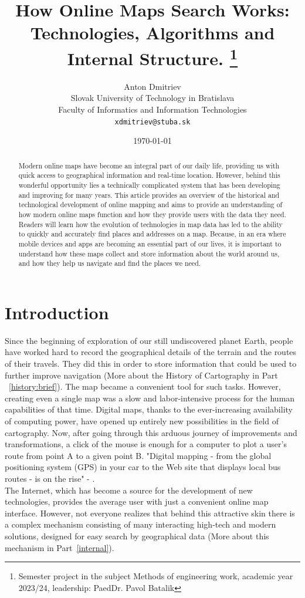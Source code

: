 \documentclass[10pt,oneside,english,a4paper]{article}
\title{How Online Maps Search Works: Technologies, Algorithms and Internal Structure.
\thanks{Semester project in the subject Methods of engineering work, academic year 2023/24, leadership: PaedDr. Pavol Batalik}}
\author{Anton Dmitriev\\[2pt]
	{\small Slovak University of Technology in Bratislava}\\
	{\small Faculty of Informatics and Information Technologies}\\
	{\small \texttt{xdmitriev@stuba.sk}}
	}
\date{\small \today}
\begin{document}
\maketitle

\begin{abstract}
	Modern online maps have become an integral part of our daily life, providing us with quick access to geographical information and real-time location. However, behind this wonderful opportunity lies a technically complicated system that has been developing and improving for many years. This article provides an overview of the historical and technological development of online mapping and aims to provide an understanding of how modern online maps function and how they provide users with the data they need. Readers will learn how the evolution of technologies in map data has led to the ability to quickly and accurately find places and addresses on a map. Because, in an era where mobile devices and apps are becoming an essential part of our lives, it is important to understand how these maps collect and store information about the world around us, and how they help us navigate and find the places we need.
\end{abstract}



\section{Introduction}
Since the beginning of exploration of our still undiscovered planet Earth, people have worked hard to record the geographical details of the terrain and the routes of their travels. They did this in order to store information that could be used to further improve navigation (More about the History of Cartography in Part ~\ref{history:brief}). The map became a convenient tool for such tasks. However, creating even a single map was a slow and labor-intensive process for the human capabilities of that time. Digital maps, thanks to the ever-increasing availability of computing power, have opened up entirely new possibilities in the field of cartography. Now, after going through this arduous journey of improvements and transformations, a click of the mouse is enough for a computer to plot a user's route from point A to a given point B. "Digital mapping - from the global positioning system (GPS) in your car to the Web site that displays local bus routes - is on the rise" - \cite{Mitchell2005}.
\\The Internet, which has become a source for the development of new technologies, provides the average user with just a convenient online map interface. However, not everyone realizes that behind this attractive skin there is a complex mechanism consisting of many interacting high-tech and modern solutions, designed for easy search by geographical data (More about this mechanism in Part~\ref{internal}).
\end{document}

